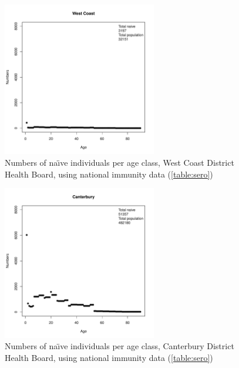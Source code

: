 \documentclass{article}
\begin{document}
\begin{figure}[H]
     \begin{center}
     \includegraphics[width=0.6\textwidth]{dhb17.pdf}
     \end{center}
     \caption{Numbers of na\"{\i}ve individuals per age class, West Coast District Health Board, using national immunity data (\autoref{table:sero})}
     \label{fig:WestCoast}
\end{figure}

\begin{figure}[H]
   \begin{center}
     \includegraphics[width=0.6\textwidth]{dhb18.pdf}
     \end{center}
     \caption{Numbers of na\"{\i}ve individuals per age class, Canterbury District Health Board, using national immunity data (\autoref{table:sero})}
     \label{fig:Canterbury}
\end{figure}
\end{document}
